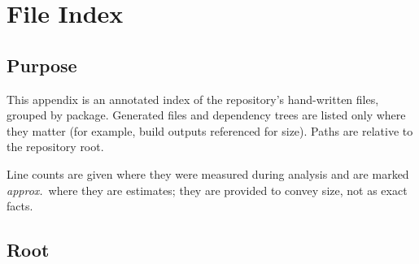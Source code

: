 \chapter{File Index}
\label{app:file-index}

\section{Purpose}

This appendix is an annotated index of the repository's hand-written files,
grouped by package. Generated files and dependency trees are listed only where
they matter (for example, build outputs referenced for size). Paths are relative
to the repository root.

Line counts are given where they were measured during analysis and are marked
\emph{approx.}\ where they are estimates; they are provided to convey size, not
as exact facts.

\section{Root}

